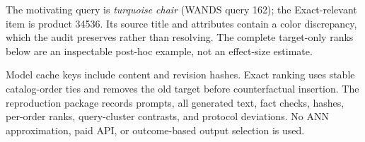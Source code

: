 


The motivating query is \emph{turquoise chair} (WANDS query 162); the Exact-relevant item is product 34536. Its source title and attributes contain a color discrepancy, which the audit preserves rather than resolving. The complete target-only ranks below are an inspectable post-hoc example, not an effect-size estimate.


Model cache keys include content and revision hashes. Exact ranking uses stable catalog-order ties and removes the old target before counterfactual insertion. The reproduction package records prompts, all generated text, fact checks, hashes, per-order ranks, query-cluster contrasts, and protocol deviations. No ANN approximation, paid API, or outcome-based output selection is used.
